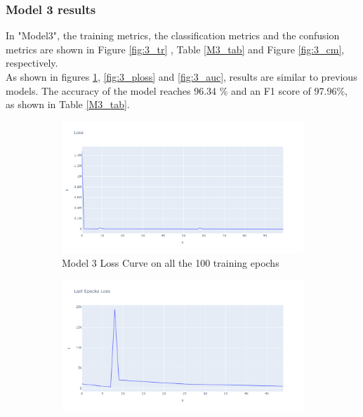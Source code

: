 \subsubsection{Model 3 results}
  In "Model3", the training metrics, the classification metrics and the confusion metrics are shown in Figure \ref{fig:3_tr} , Table \ref{M3_tab} and Figure \ref{fig:3_cm}, respectively.\\
  As shown in figures \ref{fig:3_tloss}, \ref{fig:3_ploss} and \ref{fig:3_auc}, results are similar to previous models. The accuracy of the model reaches 96.34 \% and an F1 score of 97.96\%, as shown in Table \ref{M3_tab}.
\begin{figure}[H]%
    \centering
    \begin{subfigure}{0.49\textwidth}
        \centering
        \includegraphics[width=\linewidth]{figures/ev/3_tloss.png}
        \caption{Model 3 Loss Curve on all the 100 training epochs}
    \label{fig:3_tloss}
    \end{subfigure}
    \begin{subfigure}{0.49\textwidth}
        \centering
         \includegraphics[width=\linewidth]{figures/ev/3_ploss.png}

\end{subfigure}
\end{figure}
